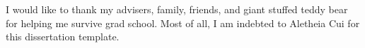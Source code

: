 
I would like to thank my advisers, family, friends, and giant stuffed teddy bear for helping me survive grad school. Most of all, I am indebted to Aletheia Cui for this dissertation template.

\lipsum[42-43]